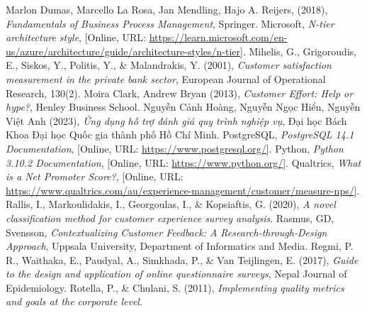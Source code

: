 \begin{thebibliography}{9}
     Marlon Dumas, Marcello La Rosa, Jan Mendling, Hajo A. Reijers, (2018), \textit{Fundamentals of Business Process Management}, Springer.
     Microsoft, \textit{N-tier architecture style}, [Online, URL: \url{https://learn.microsoft.com/en-us/azure/architecture/guide/architecture-styles/n-tier}].
     Mihelis, G., Grigoroudis, E., Siskos, Y., Politis, Y., \& Malandrakis, Y. (2001), \textit{Customer satisfaction measurement in the private bank sector}, European Journal of Operational Research, 130(2).
     Moira Clark, Andrew Bryan (2013), \textit{Customer Effort: Help or hype?}, Henley Business School.
     Nguyễn Cảnh Hoàng, Nguyễn Ngọc Hiển, Nguyễn Việt Anh (2023), \textit{Ứng dụng hỗ trợ đánh giá quy trình nghiệp vụ}, Đại học Bách Khoa Đại học Quốc gia thành phố Hồ Chí Minh.
     PostgreSQL, \textit{PostgreSQL 14.1 Documentation}, [Online, URL: \url{https://www.postgresql.org/}].
     Python, \textit{Python 3.10.2 Documentation}, [Online, URL: \url{https://www.python.org/}].
     Qualtrics, \textit{What is a Net Promoter Score?}, [Online, URL: \url{https://www.qualtrics.com/au/experience-management/customer/measure-nps/}].
     Rallis, I., Markoulidakis, I., Georgoulas, I., \& Kopsiaftis, G. (2020), \textit{A novel classification method for customer experience survey analysis}.
     Rasmus, GD, Svensson, \textit{Contextualizing Customer Feedback: A Research-through-Design Approach}, Uppsala University, Department of Informatics and Media.
     Regmi, P. R., Waithaka, E., Paudyal, A., Simkhada, P., \& Van Teijlingen, E. (2017), \textit{Guide to the design and application of online questionnaire surveys}, Nepal Journal of Epidemiology.
     Rotella, P., \& Chulani, S. (2011), \textit{Implementing quality metrics and goals at the corporate level}.
\end{thebibliography}